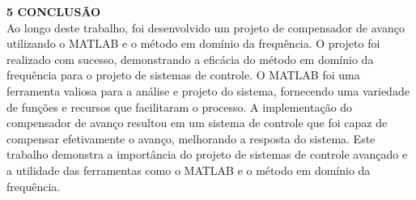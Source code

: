 \noindent \textcolor{myBlue}{\textbf{\large{5 CONCLUSÃO }}}\\

Ao longo deste trabalho, foi desenvolvido um projeto de compensador de avanço utilizando o MATLAB e o método em domínio da frequência. O projeto foi realizado com sucesso, demonstrando a eficácia do método em domínio da frequência para o projeto de sistemas de controle. O MATLAB foi uma ferramenta valiosa para a análise e projeto do sistema, fornecendo uma variedade de funções e recursos que facilitaram o processo. A implementação do compensador de avanço resultou em um sistema de controle que foi capaz de compensar efetivamente o avanço, melhorando a resposta do sistema. Este trabalho demonstra a importância do projeto de sistemas de controle avançado e a utilidade das ferramentas como o MATLAB e o método em domínio da frequência.\\
